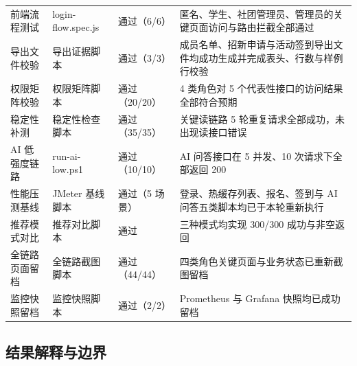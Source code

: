 \begin{table}[H]
\begin{tabular}{p{2.2cm}p{2.8cm}p{1.8cm}p{6.1cm}}
前端流程测试 & login-flow.spec.js & 通过（6/6） & 匿名、学生、社团管理员、管理员的关键页面访问与路由拦截全部通过 \\
导出文件校验 & 导出证据脚本 & 通过（3/3） & 成员名单、招新申请与活动签到导出文件均成功生成并完成表头、行数与样例行校验 \\
权限矩阵校验 & 权限矩阵脚本 & 通过（20/20） & 4 类角色对 5 个代表性接口的访问结果全部符合预期 \\
稳定性补测 & 稳定性检查脚本 & 通过（35/35） & 关键读链路 5 轮重复请求全部成功，未出现读接口错误 \\
AI 低强度链路 & run-ai-low.ps1 & 通过（10/10） & AI 问答接口在 5 并发、10 次请求下全部返回 200 \\
性能压测基线 & JMeter 基线脚本 & 通过（5 场景） & 登录、热缓存列表、报名、签到与 AI 问答五类脚本均已于本轮重新执行 \\
推荐模式对比 & 推荐对比脚本 & 通过 & 三种模式均实现 300/300 成功与非空返回 \\
全链路页面留档 & 全链路截图脚本 & 通过（44/44） & 四类角色关键页面与业务状态已重新截图留档 \\
监控快照留档 & 监控快照脚本 & 通过（2/2） & Prometheus 与 Grafana 快照均已成功留档 \\
\bottomrule
\end{tabular}
\end{table}

\subsection{结果解释与边界}

